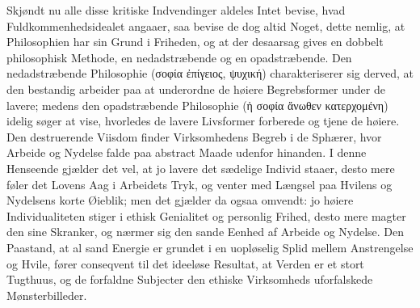 \documentclass[12pt]{book}
\begin{document}
Skjøndt nu alle disse kritiske Indvendinger aldeles Intet bevise, hvad
Fuldkommenhedsidealet angaaer, saa bevise de dog altid Noget, dette nemlig, at
Philosophien har sin Grund i Friheden, og at der desaarsag gives en dobbelt
philosophisk Methode, en nedadstræbende og en opadstræbende. Den nedadstræbende
Philosophie (σοφία ἐπίγειος, ψυχική) charakteriserer sig derved, at den bestandig
arbeider paa at underordne de høiere Begrebsformer under de lavere; medens den
opadstræbende Philosophie (ἡ σοφία ἄνωθεν κατερχομένη) idelig søger at vise,
hvorledes de lavere Livsformer forberede og tjene de høiere. Den destruerende
Viisdom finder Virksomhedens Begreb i de Sphærer, hvor Arbeide og Nydelse falde paa
abstract Maade udenfor hinanden. I denne Henseende gjælder det vel, at jo lavere det
sædelige Individ staaer, desto mere føler det Lovens Aag i Arbeidets Tryk, og venter
med Længsel paa Hvilens og Nydelsens korte Øieblik; men det gjælder da ogsaa
omvendt: jo høiere Individualiteten stiger i ethisk Genialitet og personlig Frihed,
desto mere magter den sine Skranker, og nærmer sig den sande Eenhed af Arbeide og
Nydelse. Den Paastand, at al sand Energie er grundet i en uopløselig Splid mellem
Anstrengelse og Hvile, fører conseqvent til det ideeløse Resultat, at Verden er et
stort Tugthuus, og de forfaldne Subjecter den ethiske Virksomheds uforfalskede
Mønsterbilleder.
\end{document}
